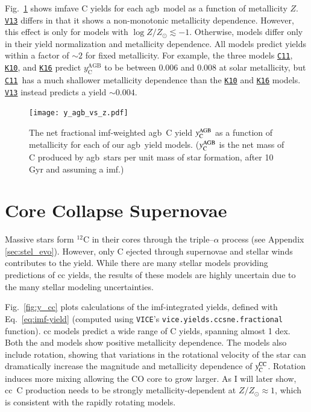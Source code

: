 \documentclass[12pt,oneside,letterpaper]{report}
\newcommand{\cc}{\gls{cc}}
\newcommand{\agb}{\gls{agb}}
\newcommand{\imf}{\gls{imf}}
\newcommand{\cxi}{\texttt{\hyperlink{C11}{C11}}}
\newcommand{\kx}{\texttt{\hyperlink{K10}{K10}}}
\newcommand{\kxvi}{\texttt{\hyperlink{K16}{K16}}}
\newcommand{\vxiii}{\texttt{\hyperlink{V13}{V13}}}
\newcommand{\VICE}{\texttt{VICE}}
\newcommand{\Ycc}{\ensuremath{y_{\rm C}^{\rm CC}}}
\newcommand{\Ycagb}{\ensuremath{y_{\rm C}^{\rm AGB}}}
\newcommand{\about}[1]{${\sim} #1$}
\begin{document}
Fig.~\ref{fig:yagb-z} shows \gls{imfave} C yields for each \agb\ model as a function of metallicity $Z$.
\vxiii{} differs in that it shows a non-monotonic metallicity dependence. However, this effect is only for models with $\log Z/Z_\odot \lesssim -1$.
Otherwise, models differ only in their yield normalization and metallicity dependence. All models predict yields within a factor of \about{2} for fixed metallicity.
For example, the three models \cxi, \kx{}, and \kxvi{} predict $y_\text{C}^\text{AGB}$ to be between 0.006 and 0.008 at solar metallicity, but \cxi\ has a much shallower metallicity dependence than the \kx{} and \kxvi{} models. \vxiii{} instead predicts a yield \about{0.004}.

\begin{figure}[htp]
    \centering
    \texttt{[image: y\_agb\_vs\_z.pdf]}

    \caption[Low-Mass-Star Yield Metallicity Dependence]{The net fractional \imf-weighted \agb\ C yield $\Ycagb$ as a function of metallicity for each of our \agb\ yield models. ($\Ycagb$ is the net mass of C produced by \agb\ stars per unit mass of star formation, after 10\,Gyr and assuming a \citet{kroupa01} \imf.)
    }
    \label{fig:yagb-z}
\end{figure}

\section{Core Collapse Supernovae}


Massive stars form $^{12}$C in their cores through the triple--$\alpha$ process (see Appendix \ref{sec:stel_evo}). However, only C ejected through supernovae and stellar winds contributes to the yield. 
While there are many stellar models providing predictions of \cc{} yields, the results of these models are highly uncertain due to the many stellar modeling uncertainties. 

Fig.~\ref{fig:y_cc} plots calculations of the \imf-integrated yields, defined with Eq.~\ref{eq:imf-yield} (computed using \VICE's \texttt{vice.yields.ccsne.fractional} function). 
\Gls{cc} models predict a wide range of C yields, spanning almost 1 dex. 
Both the \citet{NKT13} and \cite{LC18} models show positive metallicity dependence. 
The \cite{LC18} models also include rotation, showing that variations in the rotational velocity of the star can dramatically increase the magnitude and metallicity dependence of $\Ycc$. Rotation induces more mixing allowing the CO core to grow larger. As I will later show, \cc\ C production needs to be strongly metallicity-dependent at $Z/Z_\odot \approx 1$, which is consistent with the \cite{LC18} rapidly rotating models.
\end{document}
